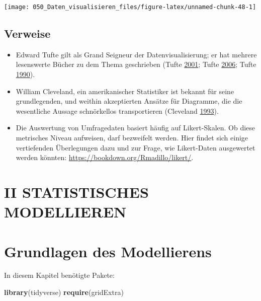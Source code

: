 \documentclass[12pt,]{book}
\newenvironment{Shaded}{\begin{snugshade}}{\end{snugshade}}
\newcommand{\KeywordTok}[1]{\textcolor[rgb]{0.13,0.29,0.53}{\textbf{{#1}}}}
\newcommand{\NormalTok}[1]{{#1}}
\begin{document}
\begin{center}\texttt{[image: 050\_Daten\_visualisieren\_files/figure-latex/unnamed-chunk-48-1]} \end{center}

\section{Verweise}\label{verweise-3}

\begin{itemize}
\item
  Edward Tufte gilt als Grand Seigneur der Datenvisualisierung; er hat
  mehrere lesenswerte Bücher zu dem Thema geschrieben (Tufte
  \protect\hyperlink{ref-1930824130}{2001}; Tufte
  \protect\hyperlink{ref-1930824165}{2006}; Tufte
  \protect\hyperlink{ref-1930824149}{1990}).
\item
  William Cleveland, ein amerikanischer Statistiker ist bekannt für
  seine grundlegenden, und weithin akzeptierten Ansätze für Diagramme,
  die die wesentliche Aussage schnörkellos transportieren (Cleveland
  \protect\hyperlink{ref-Cleveland}{1993}).
\item
  Die Auswertung von Umfragedaten basiert häufig auf Likert-Skalen. Ob
  diese metrisches Niveau aufweisen, darf bezweifelt werden. Hier findet
  sich einige vertiefenden Überlegungen dazu und zur Frage, wie
  Likert-Daten ausgewertet werden könnten:
  \url{https://bookdown.org/Rmadillo/likert/}.
\end{itemize}

\chapter*{II STATISTISCHES
MODELLIEREN}\label{ii-statistisches-modellieren}

\chapter{Grundlagen des Modellierens}\label{mod1}

In diesem Kapitel benötigte Pakete:

\begin{Shaded}
\begin{Highlighting}[]
\KeywordTok{library}\NormalTok{(tidyverse)}
\KeywordTok{require}\NormalTok{(gridExtra)}
\end{Highlighting}
\end{Shaded}
\end{document}
